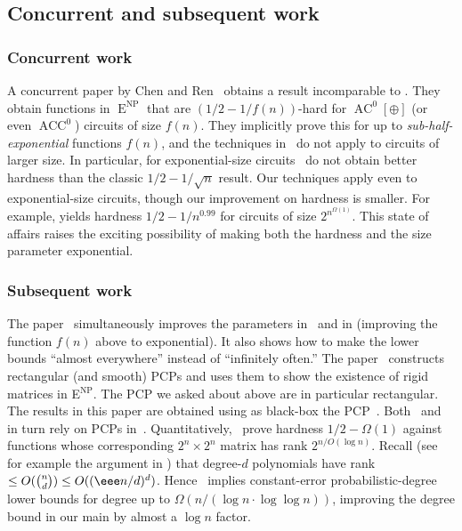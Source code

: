 \documentclass{toc}
\DeclareMathOperator{\AC}{\mathrm{AC}}  %
\DeclareMathOperator{\ACC}{\mathrm{ACC}}  %
\DeclareMathOperator{\NP}{\mathrm{NP}}  %
\DeclareMathOperator{\EEE}{\mathrm{E}}  %
\begin{document}
\subsection{Concurrent and subsequent work}

\subsubsection{Concurrent work}

A concurrent paper by Chen and Ren~\cite{ChenRen20} obtains a result
incomparable to . They obtain functions
in $\EEE^{\NP}$ that are $(1/2-1/f(n))$-hard for $\AC^{0}[\oplus]$ (or
even $\ACC^{0}$) circuits of size $f(n)$. They implicitly prove this
for up to \emph{sub-half-exponential }functions $f(n)$, and the techniques
in~\cite{ChenRen20} do not apply to circuits of larger size. In particular,
for exponential-size circuits~\cite{ChenRen20} do not obtain better
hardness than the classic $1/2-1/\sqrt{n}$ result. Our techniques
apply even to exponential-size circuits, though our improvement on
hardness is smaller. For example,  yields
hardness $1/2-1/n^{0.99}$ for circuits of size $2^{n^{\Omega(1)}}$.
This state of affairs raises the exciting possibility of making both
the hardness and the size parameter exponential.

\subsubsection{Subsequent work}

The paper~\cite{ChenLW2020-almost} simultaneously improves the parameters
in~\cite{ChenRen20} and in  (improving
the function $f(n)$ above to exponential). It also shows how to make
the lower bounds ``almost everywhere'' instead of ``infinitely
often.'' The paper~\cite{DBLP:journals/corr/abs-2005-03123} constructs
rectangular (and smooth) PCPs and uses them to show the existence
of rigid matrices in E$^{\NP}$. The PCP we asked about above are in
particular rectangular. The results in this paper are obtained using
as black-box the PCP~\cite{Ben-SassonV-AC0PCP}. Both~\cite{DBLP:journals/corr/abs-2005-03123}
and~\cite{Ben-SassonV-AC0PCP} in turn rely on PCPs in~\cite{Ben-SassonGHSV05}.
Quantitatively,~\cite{DBLP:journals/corr/abs-2005-03123} prove hardness
$1/2-\Omega(1)$ against functions whose corresponding $2^{n}\times2^{n}$
matrix has rank $2^{n/O(\log n)}$. Recall
%
(see for example the argument in ) %
that degree-$d$ polynomials have rank $\le O(\binom{n}{d})\le O((\eee n/d)^{d})$.
Hence~\cite{DBLP:journals/corr/abs-2005-03123} implies constant-error
probabilistic-degree lower bounds for degree up to $\Omega(n/(\log n\cdot\log\log n))$,
improving the degree bound in our main 
by almost a $\log n$ factor.
\end{document}
